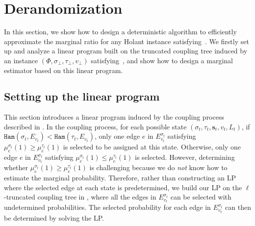 \documentclass[11pt]{article}
\newcommand{\set}[1]{\left\{#1\right\}}
\def\!#1{\mathtt{#1}}
\newcommand{\vecf}{\boldsymbol{f}}
\newcommand{\seqS}{\boldsymbol{s}}
\renewcommand{\Pr}[2][]{ \ifthenelse{\isempty{#1}}
  {\mathbf{Pr}\left[#2\right]} {\mathbf{Pr}_{#1}\left[#2\right]} }
\newcommand{\qtodo}[1]{\todo[color = purple!40, size = \tiny]{\textbf{guoliang:} #1}}
\begin{document}
    
   
    
\section{Derandomization}

In this section, we show how to design a deterministic algorithm to efficiently approximate the marginal ratio for any Holant instance satisfying~. We firstly set up and analyze a linear program built on the truncated coupling tree induced by an instance $(\Phi, \sigma_\bot, \tau_\bot, v_\bot)$ satisfying~, and show how to design a marginal estimator based on this linear program.



\subsection{Setting up the linear program}

This section introduces a linear program induced by the coupling process described in .\qtodo{polish here}
In the coupling process, for each possible state $(\sigma_t,\tau_t,\seqS_t,v_t,L_t)$, if ${\!{Ham}\left(\sigma_t, {E_{v_t}}\right)} < {\!{Ham}\left(\tau_t, {E_{v_t}}\right)}$,
only one edge $e$ in $E_{v_t}^{\sigma_t}$ satisfying $\mu^{\sigma_t}_e(1) \geq \mu^{\tau_t}_e(1)$ is selected to be assigned at this state.
Otherwise, only one edge $e$ in $E_{v_t}^{\sigma_t}$ satisfying $\mu^{\sigma_t}_e(1) \leq \mu^{\tau_t}_e(1)$ is selected.
However, determining whether $\mu^{\sigma_t}_e(1) \geq \mu^{\tau_t}_e(1)$ is challenging 
because we do \emph{not} know how to estimate the marginal probability.
Therefore, rather than constructing an LP where the selected edge at each state is predetermined,
we build our LP on the $\ell$-truncated coupling tree in ,
where all the edges in $E_{v_t}^{\sigma_t}$ can be selected with undetermined probabilities.
The selected probability for each edge in $E_{v_t}^{\sigma_t}$
can then be determined by solving the LP.
\end{document}
